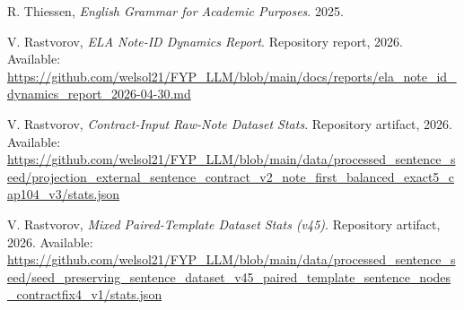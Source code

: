 \documentclass[12pt,a4paper,oneside]{report}
\begin{document}
\begin{enumerate}[label={[\arabic*]}]
  \item R. Thiessen, \emph{English Grammar for Academic Purposes}. 2025.
  \item V. Rastvorov, \emph{ELA Note-ID Dynamics Report}. Repository report, 2026. Available: \url{https://github.com/welsol21/FYP_LLM/blob/main/docs/reports/ela_note_id_dynamics_report_2026-04-30.md}
  \item V. Rastvorov, \emph{Contract-Input Raw-Note Dataset Stats}. Repository artifact, 2026. Available: \url{https://github.com/welsol21/FYP_LLM/blob/main/data/processed_sentence_seed/projection_external_sentence_contract_v2_note_first_balanced_exact5_cap104_v3/stats.json}
  \item V. Rastvorov, \emph{Mixed Paired-Template Dataset Stats (v45)}. Repository artifact, 2026. Available: \url{https://github.com/welsol21/FYP_LLM/blob/main/data/processed_sentence_seed/seed_preserving_sentence_dataset_v45_paired_template_sentence_nodes_contractfix4_v1/stats.json}
\end{enumerate}
\end{document}
